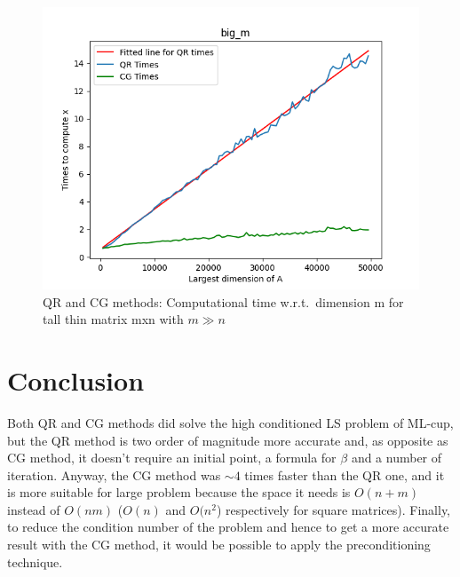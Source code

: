 \documentclass{article}
\begin{document}
        \begin{figure}
            \includegraphics[width=\linewidth]{../results/big_m.png}
            \caption{QR and CG methods: Computational time w.r.t.\ dimension m for tall thin matrix mxn with $m \gg n$}
            \label{big_m}
        \end{figure}


\section{Conclusion}\label{sec:conclusion}
Both QR and CG methods did solve the high conditioned LS problem of ML-cup, but the QR method is two order of magnitude more accurate and, as opposite as CG method, it doesn't require an initial point, a formula for $\beta$ and a number of iteration.
Anyway, the CG method was $\sim 4$ times faster than the QR one, and it is more suitable for large problem because the space it needs is $O(n+m)$ instead of $O(nm)$ ($O(n)$ and $O(n^{2}$) respectively for square matrices).
Finally, to reduce the condition number of the problem and hence to get a more accurate result with the CG method, it would be possible to apply the preconditioning technique.



\end{document}
